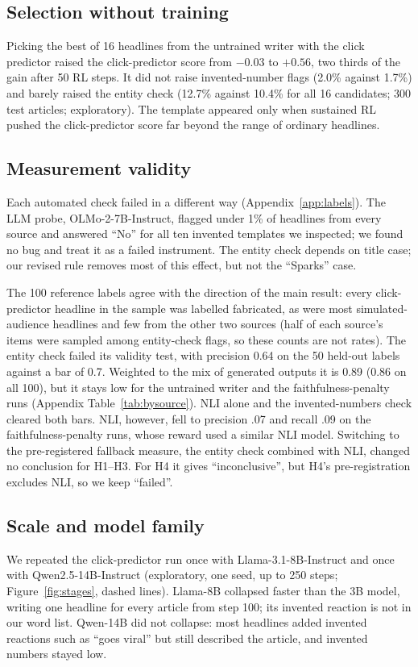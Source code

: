 \subsection{Selection without training}
Picking the best of 16 headlines from the untrained writer with the click predictor raised the click-predictor score from $-0.03$ to $+0.56$, two thirds of the gain after 50 RL steps. It did not raise invented-number flags (2.0\% against 1.7\%) and barely raised the entity check (12.7\% against 10.4\% for all 16 candidates; 300 test articles; exploratory). The template appeared only when sustained RL pushed the click-predictor score far beyond the range of ordinary headlines.

\subsection{Measurement validity}\label{sec:measurement}
Each automated check failed in a different way (Appendix~\ref{app:labels}). The LLM probe, OLMo-2-7B-Instruct, flagged under 1\% of headlines from every source and answered ``No'' for all ten invented templates we inspected; we found no bug and treat it as a failed instrument. The entity check depends on title case; our revised rule removes most of this effect, but not the ``Sparks'' case.

The 100 reference labels agree with the direction of the main result: every click-predictor headline in the sample was labelled fabricated, as were most simulated-audience headlines and few from the other two sources (half of each source's items were sampled among entity-check flags, so these counts are not rates). The entity check failed its validity test, with precision 0.64 on the 50 held-out labels against a bar of 0.7. Weighted to the mix of generated outputs it is 0.89 (0.86 on all 100), but it stays low for the untrained writer and the faithfulness-penalty runs (Appendix Table~\ref{tab:bysource}). NLI alone and the invented-numbers check cleared both bars. NLI, however, fell to precision .07 and recall .09 on the faithfulness-penalty runs, whose reward used a similar NLI model. Switching to the pre-registered fallback measure, the entity check combined with NLI, changed no conclusion for H1--H3. For H4 it gives ``inconclusive'', but H4's pre-registration excludes NLI, so we keep ``failed''.

\subsection{Scale and model family}
We repeated the click-predictor run once with Llama-3.1-8B-Instruct and once with Qwen2.5-14B-Instruct (exploratory, one seed, up to 250 steps; Figure~\ref{fig:stages}, dashed lines). Llama-8B collapsed faster than the 3B model, writing one headline for every article from step 100; its invented reaction is not in our word list. Qwen-14B did not collapse: most headlines added invented reactions such as ``goes viral'' but still described the article, and invented numbers stayed low.

